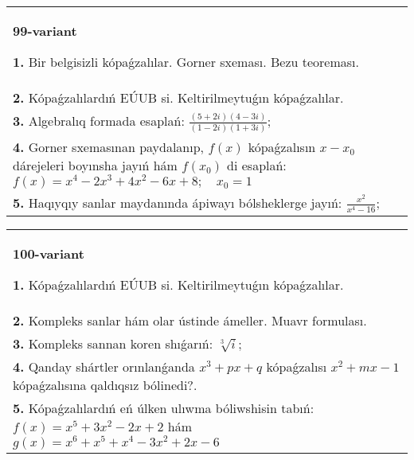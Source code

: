 \documentclass{article}
\begin{document}
\begin{tabular}{m{17cm}}
\textbf{99-variant}
\newline

\textbf{1.} Bir belgisizli kópaǵzalılar. Gorner sxeması. Bezu teoreması.  \\
\textbf{2.} Kópaǵzalılardıń EÚUB si. Keltirilmeytuǵın   kópaǵzalılar. \\
\textbf{3.} Algebralıq formada esaplań: $\frac{(5+2 i)(4-3 i)}{(1-2 i)(1+3 i)}$; \\
\textbf{4.} Gorner sxemasınan paydalanıp, $f(x)$ kópaǵzalısın $x-x_0$ dárejeleri boyınsha jayıń hám $f\left(x_0\right)$ di esaplań: $f(x)=x^4-2 x^3+4 x^2-6 x+8 ; \quad x_0=1$ \\
\textbf{5.} Haqıyqıy sanlar maydanında ápiwayı bólsheklerge jayıń:  $\frac{x^2}{x^4-16}$; \\

\end{tabular}
\vspace{1cm}


\begin{tabular}{m{17cm}}
\textbf{100-variant}
\newline

\textbf{1.} Kópaǵzalılardıń EÚUB si. Keltirilmeytuǵın   kópaǵzalılar. \\
\textbf{2.} Kompleks sanlar hám olar ústinde ámeller. Muavr formulası.  \\
\textbf{3.} Kompleks sannan koren shıǵarıń:  $\sqrt[3]{i}$; \\
\textbf{4.} Qanday shártler orınlanǵanda $x^3+p x+q$ kópaǵzalısı $x^2+m x-1$ kópaǵzalısına qaldıqsız bólinedi?. \\
\textbf{5.} Kópaǵzalılardıń eń úlken ulıwma bóliwshisin tabıń:  $f(x)=x^5+3 x^2-2 x+2$ hám $g(x)=x^6+x^5+x^4-3 x^2+2 x-6$ \\

\end{tabular}
\vspace{1cm}
\end{document}
